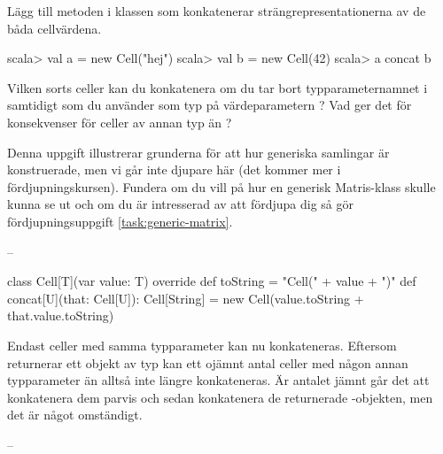 \Subtask Lägg till metoden  i klassen  som konkatenerar strängrepresentationerna av de båda cellvärdena.

\begin{REPL}
scala> val a = new Cell("hej")
scala> val b = new Cell(42)
scala> a concat b
\end{REPL}



\Subtask\Pen Vilken sorts celler kan du konkatenera om du tar bort typparameternamnet  i  samtidigt som du använder  som typ på värdeparametern ? Vad ger det för konsekvenser för celler av annan typ än ?

\Subtask\Pen Denna uppgift illustrerar grunderna för att hur generiska samlingar är konstruerade, men vi går inte djupare här (det kommer mer i fördjupningskursen). Fundera om du vill på hur en generisk Matris-klass skulle kunna se ut och om du är intresserad av att fördjupa dig så gör fördjupningsuppgift \ref{task:generic-matrix}.





\SOLUTION


\TaskSolved \what

\SubtaskSolved  --

\SubtaskSolved  \begin{Code}
class Cell[T](var value: T){
	override def toString = "Cell(" + value + ")"
	def concat[U](that: Cell[U]): Cell[String] =
		new Cell(value.toString + that.value.toString)
}
\end{Code}

\SubtaskSolved   Endast celler med samma typparameter kan nu konkateneras. Eftersom  returnerar ett objekt av typ  kan ett ojämnt antal celler med någon annan typparameter än  alltså inte längre konkateneras. Är antalet jämnt går det att konkatenera dem parvis och sedan konkatenera de returnerade -objekten, men det är något omständigt.

\SubtaskSolved   --




\QUESTEND









